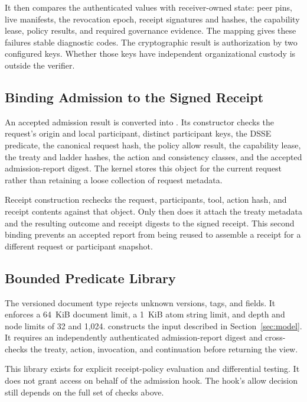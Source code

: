 It then compares the authenticated values with receiver-owned state: peer
pins, live manifests, the revocation epoch, receipt signatures and hashes, the
capability lease, policy results, and required governance evidence. The
 mapping gives these failures stable
diagnostic codes. The cryptographic result is authorization by two configured
keys. Whether those keys have independent organizational custody is outside
the verifier.

\subsection{Binding Admission to the Signed Receipt}

An accepted admission result is converted into
. Its constructor checks the
request's origin and local participant, distinct participant keys, the DSSE
predicate, the canonical request hash, the policy allow result, the capability
lease, the treaty and ladder hashes, the action and consistency classes, and
the accepted admission-report digest. The kernel stores this object for the
current request rather than retaining a loose collection of request metadata.

Receipt construction rechecks the request, participants, tool, action hash,
and receipt contents against that object. Only then does it attach the treaty
metadata and the resulting outcome and receipt digests to the signed receipt.
This second binding prevents an accepted report from being reused to assemble
a receipt for a different request or participant snapshot.

\subsection{Bounded Predicate Library}

The versioned document type
 rejects unknown
versions, tags, and fields. It enforces a 64~KiB document limit, a 1~KiB atom
string limit, and depth and node limits of 32 and 1,024.
 constructs the
input described in Section~\ref{sec:model}. It requires an independently
authenticated admission-report digest and cross-checks the treaty, action,
invocation, and continuation before returning the view.

This library exists for explicit receipt-policy evaluation and differential
testing. It does not grant access on behalf of the admission hook. The hook's
allow decision still depends on the full set of checks above.

